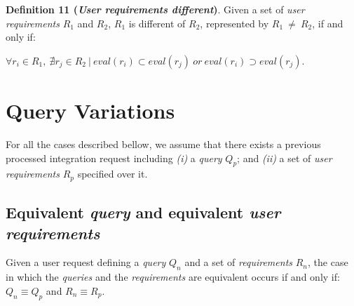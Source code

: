 \bigskip
\noindent \textbf{Definition 11 (\textsl{User requirements different})}.
Given a set of \textsl{user requirements} $R_{1}$ and $R_{2}$, $R_{1}$ is different of $R_{2}$, represented by $R_{1} \ \neq \ R_{2}$, if and only if:
\begin{flushleft}
$\forall r_{i} \in R_{1}, \ \nexists r_{j} \in R_{2} \ \vert \ eval (r_{i}) \subset eval(r_{j}) \ or \ eval (r_{i}) \supset eval(r_{j})$.
\end{flushleft}
%
%
%


\section{Query Variations}

For all the cases described bellow, we assume that there exists a previous processed integration request including \textit{(i)} a \textsl{query} $Q_{p}$; and \textit{(ii)} a set of \textsl{user requirements} $R_{p}$ specified over it.

\subsection{Equivalent \textsl{query} and equivalent \textsl{user requirements}}
Given a user request defining a \textsl{query} $Q_{n}$ and a set of \textsl{requirements} $R_{n}$, the case in which the \textsl{queries} and the \textsl{requirements} are equivalent occurs if and only if: $Q_{n} \equiv Q_{p}$ and $R_{n} \equiv R_{p}$.

